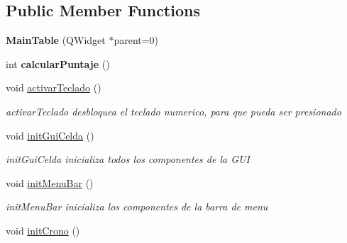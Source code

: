 \subsection*{Public Member Functions}
\begin{DoxyCompactItemize}
\item 
\hypertarget{class_main_table_a536fdc279aa0ed4e14cc25ab6f89a74d}{{\bfseries Main\-Table} (Q\-Widget $\ast$parent=0)}\label{class_main_table_a536fdc279aa0ed4e14cc25ab6f89a74d}

\item 
\hypertarget{class_main_table_ae0edc05c64dd375c326b26cd9cf255bb}{int {\bfseries calcular\-Puntaje} ()}\label{class_main_table_ae0edc05c64dd375c326b26cd9cf255bb}

\item 
\hypertarget{class_main_table_a1e0ed271c24621b716536f18a1e86790}{void \hyperlink{class_main_table_a1e0ed271c24621b716536f18a1e86790}{activar\-Teclado} ()}\label{class_main_table_a1e0ed271c24621b716536f18a1e86790}

\begin{DoxyCompactList}\small\item\em activar\-Teclado desbloquea el teclado numerico, para que pueda ser presionado \end{DoxyCompactList}\item 
\hypertarget{class_main_table_af7243d220cd940102d4eb24515b308fb}{void \hyperlink{class_main_table_af7243d220cd940102d4eb24515b308fb}{init\-Gui\-Celda} ()}\label{class_main_table_af7243d220cd940102d4eb24515b308fb}

\begin{DoxyCompactList}\small\item\em init\-Gui\-Celda inicializa todos los componentes de la G\-U\-I \end{DoxyCompactList}\item 
\hypertarget{class_main_table_a557c8122a5531cd91cb139168f7f77ac}{void \hyperlink{class_main_table_a557c8122a5531cd91cb139168f7f77ac}{init\-Menu\-Bar} ()}\label{class_main_table_a557c8122a5531cd91cb139168f7f77ac}

\begin{DoxyCompactList}\small\item\em init\-Menu\-Bar inicializa los componentes de la barra de menu \end{DoxyCompactList}\item 
\hypertarget{class_main_table_a2062d3ec91f518a124cdfde39f88b5bc}{void \hyperlink{class_main_table_a2062d3ec91f518a124cdfde39f88b5bc}{init\-Crono} ()}\label{class_main_table_a2062d3ec91f518a124cdfde39f88b5bc}


\end{DoxyCompactItemize}
